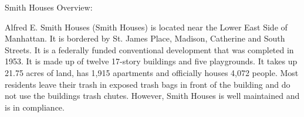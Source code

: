 Smith Houses Overview:

Alfred E. Smith Houses (Smith Houses) is located near the Lower East Side of Manhattan. It is bordered by St. James Place, Madison, Catherine and South Streets. It is a federally funded conventional development that was completed in 1953. It is made up of twelve 17-story buildings and five playgrounds. It takes up 21.75 acres of land,  has 1,915 apartments and officially houses 4,072 people. Most residents leave their trash in exposed trash bags in front of the building and do not use the buildings trash chutes. However, Smith Houses is well maintained and is in compliance.
